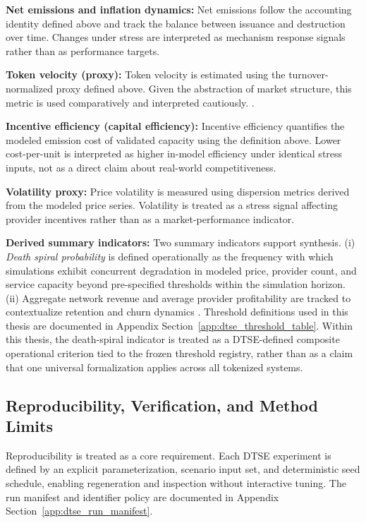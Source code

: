 \noindent\textbf{Net emissions and inflation dynamics:}
Net emissions follow the accounting identity defined above and track the balance between issuance and destruction over time. Changes under stress are interpreted as mechanism response signals rather than as performance targets.

\noindent\textbf{Token velocity (proxy):}
Token velocity is estimated using the turnover-normalized proxy defined above. Given the abstraction of market structure, this metric is used comparatively and interpreted cautiously.
\cite{CFA2018}.

\noindent\textbf{Incentive efficiency (capital efficiency):}
Incentive efficiency quantifies the modeled emission cost of validated capacity using the definition above. Lower cost-per-unit is interpreted as higher in-model efficiency under identical stress inputs, not as a direct claim about real-world competitiveness.

\noindent\textbf{Volatility proxy:}
Price volatility is measured using dispersion metrics derived from the modeled price series. Volatility is treated as a stress signal affecting provider incentives rather than as a market-performance indicator.

\noindent\textbf{Derived summary indicators:}
Two summary indicators support synthesis. (i) \emph{Death spiral probability} is defined operationally as the frequency with which simulations exhibit concurrent degradation in modeled price, provider count, and service capacity beyond pre-specified thresholds within the simulation horizon. (ii) Aggregate network revenue and average provider profitability are tracked to contextualize retention and churn dynamics \cite{Morris2019}. Threshold definitions used in this thesis are documented in Appendix Section~\ref{app:dtse_threshold_table}.
Within this thesis, the death-spiral indicator is treated as a DTSE-defined composite operational criterion tied to the frozen threshold registry, rather than as a claim that one universal formalization applies across all tokenized systems.

\subsection{Reproducibility, Verification, and Method Limits}
\label{subsec:dtse_reproducibility}
Reproducibility is treated as a core requirement. Each DTSE experiment is defined by an explicit parameterization, scenario input set, and deterministic seed schedule, enabling regeneration and inspection without interactive tuning. The run manifest and identifier policy are documented in Appendix Section~\ref{app:dtse_run_manifest}.

